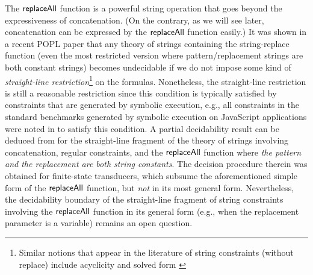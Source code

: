 The $\mathsf{replaceAll}$ function is a powerful string operation that goes beyond the 
expressiveness of concatenation. (On the contrary, as we will see later, concatenation can be expressed by the $\mathsf{replaceAll}$ function easily.) 
It was shown in a recent POPL paper \cite{LB16} that any theory of strings containing the 
string-replace function (even the most restricted version where 
pattern/replacement strings are both constant strings) becomes undecidable if 
we do not impose some kind of
\emph{straight-line restriction}\footnote{Similar notions that appear in the 
literature of string constraints (without replace) include acyclicity 
\cite{Abdulla14} and solved form \cite{Vijay-length}} on 
the formulas. Nonetheless,
the straight-line restriction is still a reasonable restriction since this
condition is typically satisfied by constraints that are generated by symbolic 
execution,
e.g., all constraints in the standard benchmarks \cite{Berkeley-JavaScript}
generated by symbolic execution on JavaScript applications were
noted in \cite{Vijay-length} to satisfy this condition. 
A partial decidability result 
can be deduced from \cite{LB16}
for the straight-line fragment of the theory of strings involving 
concatenation, regular constraints, and the $\mathsf{replaceAll}$ function where \emph{the 
pattern and the replacement are both string constants}. 
The decision procedure therein was obtained for finite-state transducers, which
subsume the aforementioned simple form of the $\mathsf{replaceAll}$ function, but
\emph{not} in its most general form.
Nevertheless, the decidability boundary of the straight-line fragment of string
constraints involving the $\mathsf{replaceAll}$ function in its general form (e.g., 
when the replacement parameter is a variable) remains an open question.





